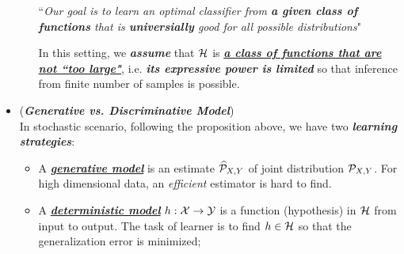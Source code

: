 \documentclass[11pt]{article}
\begin{document}
\begin{itemize}
\begin{remark}
\begin{enumerate}
``\emph{Our goal is to learn an optimal classifier from \textbf{a given class  of functions} that is \textbf{universially} good for all possible distributions}"

In this setting, we \emph{\textbf{assume}} that ${\mathcal H}$ is \emph{\underline{\textbf{a class of functions that are not ``too large"}}}, i.e. \emph{\textbf{its expressive power is limited}} so that inference from finite number of samples is possible. 






\end{enumerate}
\end{remark}

\item \begin{definition} (\emph{\textbf{Generative vs. Discriminative Model}})\\
In stochastic scenario, following the proposition above, we have two \emph{\textbf{learning strategies}}: 
\begin{itemize}
\item A \underline{\emph{\textbf{generative model}}} is an estimate $\widehat{{\mathcal P}}_{X,Y}$ of joint distribution ${\mathcal P}_{X,Y}$. For high dimensional data, an \emph{efficient} estimator is hard to find.

\item  A \underline{\emph{\textbf{deterministic model}}} $h: {\mathcal X} \rightarrow {\mathcal Y}$ is a function (hypothesis) in ${\mathcal H}$ from input to output. The task of learner is to find $h \in {\mathcal H}$ so that the generalization error is minimized; 


\end{itemize}
\end{definition}
\end{itemize}
\end{document}
